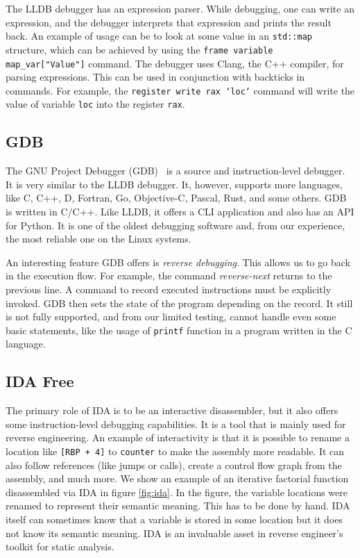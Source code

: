 The LLDB debugger has an expression parser. While debugging, one can write an
expression, and the debugger interprets that expression and prints the result
back. An example of usage can be to look at some value in an \texttt{std::map}
structure, which can be achieved by using the \texttt{frame variable
map\_var["Value"]} command. The debugger uses Clang, the C++ compiler, for
parsing expressions. This can be used in conjunction with backticks in
commands. For example, the \texttt{register write rax `loc`} command will write
the value of variable \texttt{loc} into the register \texttt{rax}.

\subsection{GDB}
The GNU Project Debugger (GDB)~\cite{gdb-manual} is a source and
instruction-level debugger. It is very similar to the LLDB debugger. It,
however, supports more languages, like C, C++, D, Fortran, Go, Objective-C,
Pascal, Rust, and some others. GDB is written in C/C++. Like LLDB, it offers a
CLI application and also has an API for Python. It is one of the oldest
debugging software and, from our experience, the most reliable one on the Linux
systems.

An interesting feature GDB offers is \textit{reverse debugging}. This allows us
to go back in the execution flow. For example, the command
\textit{reverse-next} returns to the previous line. A command to record
executed instructions must be explicitly invoked. GDB then sets the state of
the program depending on the record. It still is not fully supported, and from
our limited testing, cannot handle even some basic statements, like the usage
of \texttt{printf} function in a program written in the C language.

\subsection{IDA Free}
The primary role of IDA is to be an interactive disassembler, but it also
offers some instruction-level debugging capabilities. It is a tool that is
mainly used for reverse engineering. An example of interactivity is that it is
possible to rename a location like \texttt{[RBP + 4]} to \texttt{counter} to
make the assembly more readable. It can also follow references (like jumps or
calls), create a control flow graph from the assembly, and much more. We show
an example of an iterative factorial function disassembled via IDA in figure
\ref{fig:ida}. In the figure, the variable locations were renamed to represent
their semantic meaning. This has to be done by hand. IDA itself can sometimes
know that a variable is stored in some location but it does not know its
semantic meaning. IDA is an invaluable asset in reverse engineer's toolkit for
static analysis.

